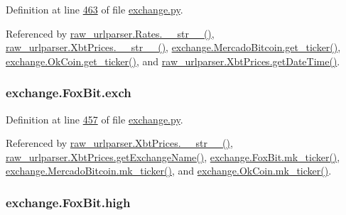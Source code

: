 Definition at line \hyperlink{exchange_8py_source_l00463}{463} of file \hyperlink{exchange_8py_source}{exchange.\+py}.



Referenced by \hyperlink{raw__urlparser_8py_source_l00038}{raw\+\_\+urlparser.\+Rates.\+\_\+\+\_\+str\+\_\+\+\_\+()}, \hyperlink{raw__urlparser_8py_source_l00074}{raw\+\_\+urlparser.\+Xbt\+Prices.\+\_\+\+\_\+str\+\_\+\+\_\+()}, \hyperlink{exchange_8py_source_l00535}{exchange.\+Mercado\+Bitcoin.\+get\+\_\+ticker()}, \hyperlink{exchange_8py_source_l00600}{exchange.\+Ok\+Coin.\+get\+\_\+ticker()}, and \hyperlink{raw__urlparser_8py_source_l00059}{raw\+\_\+urlparser.\+Xbt\+Prices.\+get\+Date\+Time()}.

\subsubsection[{\texorpdfstring{exch}{exch}}]{\setlength{\rightskip}{0pt plus 5cm}exchange.\+Fox\+Bit.\+exch}\hypertarget{classexchange_1_1_fox_bit_a3922433dcfe54e39c3c0da12fa252658}{}\label{classexchange_1_1_fox_bit_a3922433dcfe54e39c3c0da12fa252658}


Definition at line \hyperlink{exchange_8py_source_l00457}{457} of file \hyperlink{exchange_8py_source}{exchange.\+py}.



Referenced by \hyperlink{raw__urlparser_8py_source_l00074}{raw\+\_\+urlparser.\+Xbt\+Prices.\+\_\+\+\_\+str\+\_\+\+\_\+()}, \hyperlink{raw__urlparser_8py_source_l00068}{raw\+\_\+urlparser.\+Xbt\+Prices.\+get\+Exchange\+Name()}, \hyperlink{exchange_8py_source_l00474}{exchange.\+Fox\+Bit.\+mk\+\_\+ticker()}, \hyperlink{exchange_8py_source_l00549}{exchange.\+Mercado\+Bitcoin.\+mk\+\_\+ticker()}, and \hyperlink{exchange_8py_source_l00614}{exchange.\+Ok\+Coin.\+mk\+\_\+ticker()}.

\subsubsection[{\texorpdfstring{high}{high}}]{\setlength{\rightskip}{0pt plus 5cm}exchange.\+Fox\+Bit.\+high}\hypertarget{classexchange_1_1_fox_bit_a4f6dfaecbcc17ceadddf52d266d9c00d}{}\label{classexchange_1_1_fox_bit_a4f6dfaecbcc17ceadddf52d266d9c00d}


